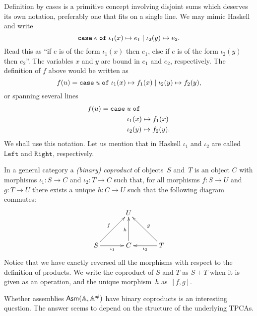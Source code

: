 Definition by cases is a primitive concept involving disjoint sums
which deserves its own notation, preferably one that fits on a single
line. We may mimic Haskell and write
%
\begin{equation*}
  \mathtt{case}\;e\;\mathtt{of}\;\iota_1(x) \mapsto e_1 \mid \iota_2(y) \mapsto e_2.
\end{equation*}
%
Read this as ``if $e$ is of the form $\iota_1(x)$ then $e_1$, else if
$e$ is of the form $\iota_2(y)$ then $e_2$''. The variables $x$ and
$y$ are bound in $e_1$ and $e_2$, respectively. The definition of $f$
above would be written as
%
\begin{equation*}
  f(u) = \mathtt{case}\;u\;\mathtt{of}\;\iota_1(x) \mapsto f_1(x) \mid \iota_2(y) \mapsto f_2(y),
\end{equation*}
%
or spanning several lines
%
\begin{equation*}
  f(u) = \begin{aligned}[t]\mathtt{case}\;&u\;\mathtt{of}\\&\iota_1(x) \mapsto f_1(x) \\&\iota_2(y) \mapsto f_2(y).\end{aligned}
\end{equation*}
%
We shall use this notation. Let us mention that in Haskell $\iota_1$
and $\iota_2$ are called $\mathtt{Left}$ and $\mathtt{Right}$,
respectively.

In a general category a \emph{(binary) coproduct} of objects~$S$
and~$T$ is an object $C$ with morphisms $\iota_1 : S \to C$ and
$\iota_2 : T \to C$ such that, for all morphisms $f : S \to U$ and $g
: T \to U$ there exists a unique $h : C \to U$ such that the following
diagram commutes:
%
\begin{equation*}
  \xymatrix@+1em{
    &
    {U}
    &
    \\
    {S}
    \ar[r]_{\iota_1}
    \ar[ru]^{f}
    &
    {C}
    \ar[u]^{h}
    &
    {T}
    \ar[l]^{\iota_2}
    \ar[lu]_{g}
  }
\end{equation*}
%
Notice that we have exactly reversed all the morphisms with respect to
the definition of products. We write the coproduct of $S$ and $T$ as
$S + T$ when it is given as an operation, and the unique morphism~$h$
as~$[f,g]$.

Whether assemblies $\mathsf{Asm}(\mathbb{A},\mathbb{A}^{\#})$ have binary coproducts is an interesting
question. The answer seems to depend on the structure of the
underlying TPCAs.

